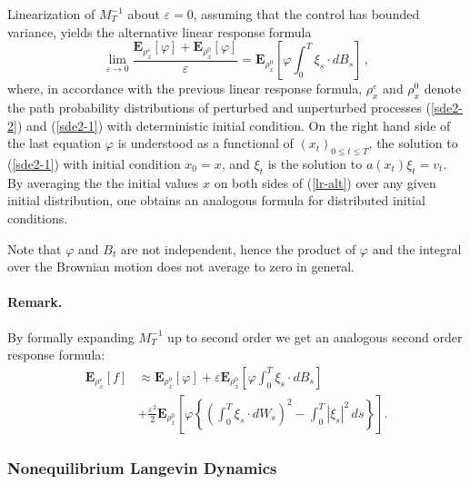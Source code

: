 \documentclass[]{tMPH2e}
\newcommand{\eps}{\varepsilon}
\newcommand{\bE}{{\mathbf E}}
\begin{document}
Linearization of $M_{T}^{-1}$ about $\eps=0$, assuming that the control has bounded variance, yields the alternative linear response formula 
\begin{equation}\label{lr-alt}
\lim_{\eps\to 0}\frac{\bE_{\rho_{x}^{\eps}}[\varphi] + \bE_{\rho_{x}^{0}}[\varphi]}{\eps} = \bE_{\rho_{x}^{0}}\left[\varphi \int_{0}^{T}\xi_{s}\cdot dB_{s} \right]\,,
\end{equation}
where, in accordance with the previous linear response formula, $\rho_{x}^{\eps}$ and $\rho_{x}^{0}$ denote the path probability distributions of perturbed and unperturbed processes (\ref{sde2-2}) and (\ref{sde2-1}) with deterministic initial condition. On the right hand side of the last equation $\varphi$ is understood as a functional of $(x_{t})_{0\le t\le T}$, the solution to (\ref{sde2-1}) with initial condition $x_{0}=x$, and $\xi_{t}$ is the solution to $a(x_{t})\xi_{t}=v_{t}$. By averaging the the initial values $x$ on both sides of (\ref{lr-alt}) over any given initial distribution, one obtains an analogous formula for distributed initial conditions.  

Note that $\varphi$ and $B_{t}$ are not independent, hence the product of $\varphi$ and the integral over the Brownian motion does not average to zero in general. 


\paragraph*{Remark.} 
By formally expanding $M^{-1}_T$ up to second order we get an analogous second order response formula: 
\begin{equation}\label{2nd}
\begin{aligned}
\bE_{\rho_{x}^{\eps}}[f] & \approx \bE_{\rho_{x}^{0}}[\varphi]  + \eps \bE_{\rho_{x}^{0}}\left[\varphi\int_{0}^{T}\xi_{s}\cdot dB_{s} \right]\\  
& + \frac{\eps^{2}}{2} \bE_{\rho_{x}^{0}}\left[\varphi\left\{\left(\int_{0}^{T}\xi_{s}\cdot dW_{s}\right)^2 -\int_0^T |\xi_s|^2\,ds\right\} \right].
\end{aligned}
\end{equation}


 
 

\subsubsection*{Nonequilibrium Langevin Dynamics}
\end{document}
